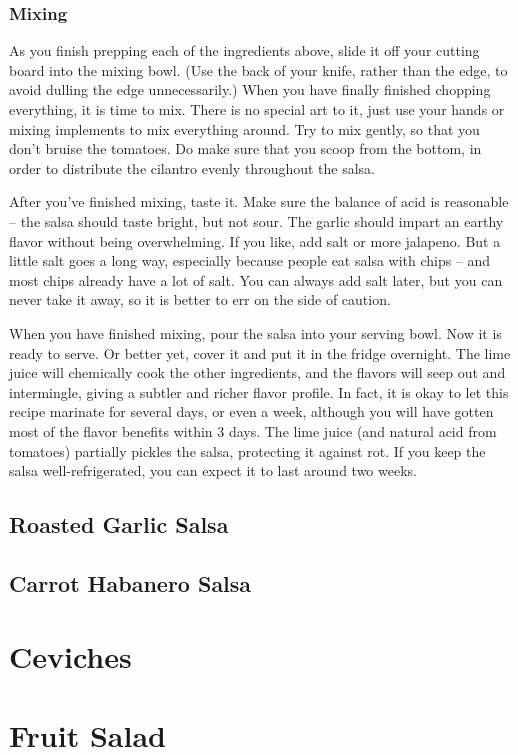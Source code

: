 \subsubsection{Mixing}

As you finish prepping each of the ingredients above, slide it off your cutting board into the mixing bowl. (Use the back of your knife, rather than the edge, to avoid dulling the edge unnecessarily.) When you have finally finished chopping everything, it is time to mix. There is no special art to it, just use your hands or mixing implements to mix everything around. Try to mix gently, so that you don't bruise the tomatoes. Do make sure that you scoop from the bottom, in order to distribute the cilantro evenly throughout the salsa.

After you've finished mixing, taste it. Make sure the balance of acid is reasonable -- the salsa should taste bright, but not sour. The garlic should impart an earthy flavor without being overwhelming. If you like, add salt or more jalapeno. But a little salt goes a long way, especially because people eat salsa with chips -- and most chips already have a lot of salt. You can always add salt later, but you can never take it away, so it is better to err on the side of caution.

When you have finished mixing, pour the salsa into your serving bowl. Now it is ready to serve. Or better yet, cover it and put it in the fridge overnight. The lime juice will chemically cook the other ingredients, and the flavors will seep out and intermingle, giving a subtler and richer flavor profile. In fact, it is okay to let this recipe marinate for several days, or even a week, although you will have gotten most of the flavor benefits within 3 days. The lime juice (and natural acid from tomatoes) partially pickles the salsa, protecting it against rot. If you keep the salsa well-refrigerated, you can expect it to last around two weeks.

\newpage  \subsection{Roasted Garlic Salsa}

\newpage  \subsection{Carrot Habanero Salsa}

\newpage \section{Ceviches}

\newpage \section{Fruit Salad}



